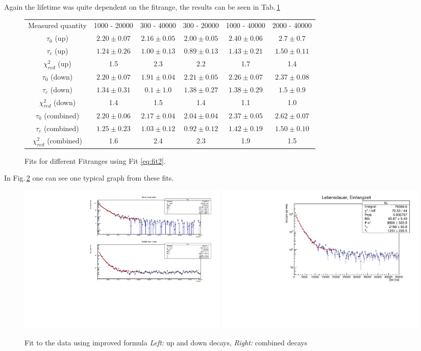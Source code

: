 Again the lifetime was quite dependent on the fitrange, the results can be seen in Tab.\,\ref{t:einfangzeiten}

\begin{figure}
\begin{tabularx}{\textwidth}{| c | c | c | c | c | c |}
Measured quantity & 1000 - 20000 & 300 - 40000 & 300 - 20000 & 1000 - 40000 & 2000 - 40000\\
$\tau_0$ (up) & $2.20\pm0.07$ & $2.16\pm0.05$ & $2.00\pm0.05$ & $2.40\pm0.06$ & $2.7\pm0.7  $ \\
$\tau_c$ (up) & $1.24\pm0.26$ & $1.00\pm0.13$ & $0.89\pm0.13$ & $1.43\pm0.21$ & $1.50\pm0.11$ \\
$\chi^2_{red}$ (up) & 1.5 & 2.3 & 2.2 & 1.7 & 1.4 \\
$\tau_0$ (down) & $2.20\pm0.07$ & $1.91\pm 0.04$ & $2.21\pm0.05$ & $2.26\pm0.07$ & $2.37\pm0.08$ \\
$\tau_c$ (down) & $1.34\pm0.31$ & $0.1\pm1.0$ & $1.38 \pm 0.27$  & $1.38\pm0.29$ & $1.5\pm0.9  $ \\
$\chi^2_{red}$ (down) & 1.4 & 1.5 & 1.4 & 1.1 & 1.0 \\
$\tau_0$ (combined) & $2.20\pm0.06$ & $2.17\pm0.04$ & $2.04\pm0.04$ & $2.37\pm0.05$ & $2.62\pm0.07$ \\
$\tau_c$ (combined) & $1.25\pm0.23$ & $1.03\pm0.12$ & $0.92\pm0.12$ & $1.42\pm0.19$ & $1.50\pm0.10$ \\
$\chi^2_{red}$ (combined) & 1.6 & 2.4 & 2.3 & 1.9 & 1.5
\end{tabularx}
\caption{Fits for different Fitranges using Fit \ref{eq:fit2}.}
\label{t:einfangzeiten}
\end{figure}
In Fig.\,\ref{f:einfangzeiten} one can see one typical graph from these fits. 

\begin{figure}[H]
    \centering
    \includegraphics[width=0.49\textwidth]{figures/Einfangszeit_updown.pdf}
    \includegraphics[width=0.49\textwidth]{figures/Einfangszeit_combined.pdf}
    \caption{Fit to the data using improved formula \emph{Left:} up and down decays, \emph{Right:} combined decays}
    \label{f:einfangzeiten}
\end{figure}


